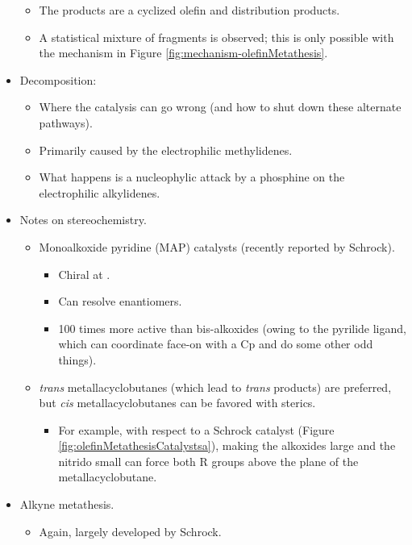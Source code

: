 \documentclass[../notes.tex]{subfiles}
\begin{document}
\begin{itemize}
\begin{itemize}
        \item The products are a cyclized olefin and distribution products.
        \item A statistical mixture of  fragments is observed; this is only possible with the mechanism in Figure \ref{fig:mechanism-olefinMetathesis}.
    \end{itemize}
    \item Decomposition:
    \begin{itemize}
        \item Where the catalysis can go wrong (and how to shut down these alternate pathways).
        \item Primarily caused by the electrophilic methylidenes.
        \item What happens is a nucleophylic attack by a phosphine on the electrophilic alkylidenes.
    \end{itemize}
    \item Notes on stereochemistry.
    \begin{itemize}
        \item Monoalkoxide pyridine (MAP) catalysts (recently reported by Schrock).
        \begin{itemize}
            \item Chiral at .
            \item Can resolve enantiomers.
            \item 100 times more active than bis-alkoxides (owing to the pyrilide ligand, which can coordinate face-on with a Cp and do some other odd things).
        \end{itemize}
        \item \emph{trans} metallacyclobutanes (which lead to \emph{trans} products) are preferred, but \emph{cis} metallacyclobutanes can be favored with sterics.
        \begin{itemize}
            \item For example, with respect to a Schrock catalyst (Figure \ref{fig:olefinMetathesisCatalystsa}), making the alkoxides large and the nitrido small can force both R groups above the plane of the metallacyclobutane.
        \end{itemize}
    \end{itemize}
    \item Alkyne metathesis.
    \begin{itemize}
        \item Again, largely developed by Schrock.
    \end{itemize}

\end{itemize}
\end{document}
